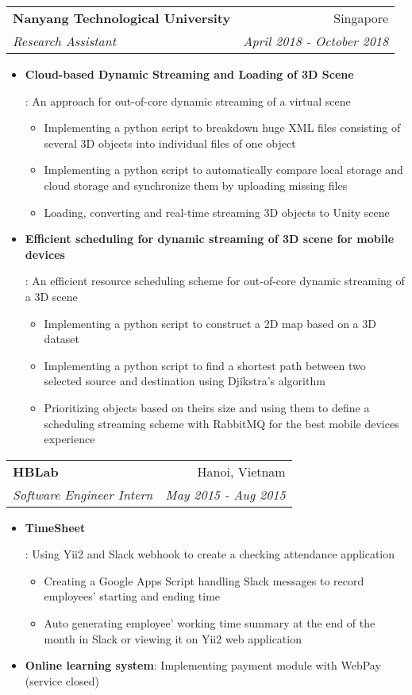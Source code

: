 \documentclass[letterpaper,10pt]{article}
\makeatletter
\newcommand{\resumeItem}[2]{
  \item\small{
    \textbf{#1}{: #2 \vspace{-2pt}}
  }
}
\newcommand{\resumeSubheading}[4]{
  \vspace{-1pt}\item[]
  \begin{tabular*}{0.98\textwidth}{l@{\extracolsep{\fill}}r}
      \hspace{-10pt}\textbf{#1} & #2 \\
      \hspace{-10pt}\textit{\small#3} & \textit{\small #4} \\
    \end{tabular*}\vspace{-5pt}
}
\newcommand{\resumeItemListStart}{\begin{itemize}}
\newcommand{\resumeItemListEnd}{\end{itemize}\vspace{-5pt}}
\makeatother
\begin{document}
    \resumeSubheading
      {Nanyang Technological University}{Singapore}
      {Research Assistant}{April 2018 - October 2018}
      \resumeItemListStart
        \resumeItem{Cloud-based Dynamic Streaming and Loading of 3D Scene}
          {An approach for out-of-core dynamic streaming of a virtual scene
          	\begin{itemize}
          		\item Implementing a python script to breakdown huge XML files consisting of several 3D objects into individual files of one object 
          		\item Implementing a python script to automatically compare local storage and cloud storage and synchronize them by uploading missing files 
          		\item Loading, converting and real-time streaming 3D objects to Unity scene
          	\end{itemize}
          }
      \resumeItem{Efficient scheduling for dynamic streaming of 3D scene for mobile devices}
      {An efficient resource scheduling scheme for out-of-core dynamic streaming of a 3D scene
      	\begin{itemize}
      		\item Implementing a python script to construct a 2D map based on a 3D dataset
      		\item Implementing a python script to find a shortest path between two selected source and destination using Djikstra's algorithm
      		\item Prioritizing objects based on theirs size and using them to define a scheduling streaming scheme with RabbitMQ for the best mobile devices experience
      	\end{itemize}
      }
      \resumeItemListEnd

    \resumeSubheading
      {HBLab}{Hanoi, Vietnam}
      {Software Engineer Intern}{May 2015 - Aug 2015}
      \resumeItemListStart
        \resumeItem{TimeSheet}
        {Using Yii2 and Slack webhook to create a checking attendance application
          \begin{itemize}
          	\item Creating a Google Apps Script handling Slack messages to record employees' starting and ending time
          	\item Auto generating employee' working time summary at the end of the month in Slack or viewing it on Yii2 web application
          \end{itemize}
      	}
      \resumeItem{Online learning system}
      {Implementing payment module with WebPay (service closed)}
      \resumeItemListEnd
\end{document}
